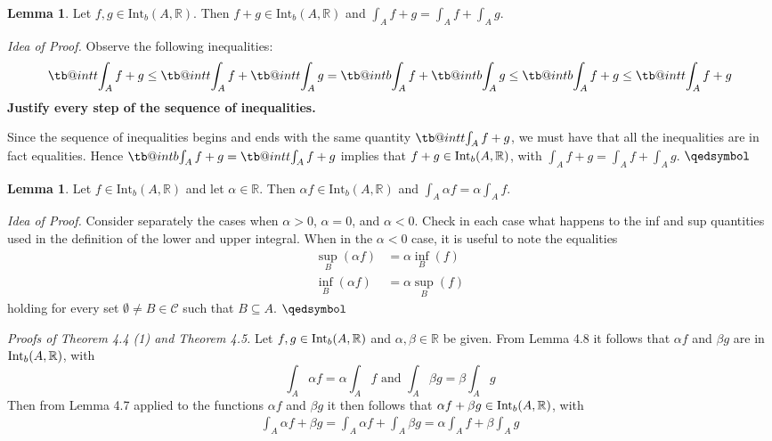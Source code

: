 \documentclass[11pt]{article}
\makeatletter
\theoremstyle{definition}
\newtheorem{lemma}[thm]{Lemma}
\newcommand{\R}{\ensuremath{\mathbb{R}}}
\newcommand{\QED}{\tag*{$\qedsymbol$}}
\newcommand\tint{\mathop{\mathpalette\tb@int{t}}\!\int}
\newcommand\bint{\mathop{\mathpalette\tb@int{b}}\!\int}
\newcommand\tb@int[2]{%
  \sbox\z@{$\m@th#1\int$}%
  \if#2t%
    \rlap{\hbox to\wd\z@{%
      \hfil
      \vrule width .35em height \dimexpr\ht\z@+1.4pt\relax depth -\dimexpr\ht\z@+1pt\relax
      \kern.05em %
    }}
  \else
    \rlap{\hbox to\wd\z@{%
      \vrule width .35em height -\dimexpr\dp\z@+1pt\relax depth \dimexpr\dp\z@+1.4pt\relax
      \hfil
    }}
  \fi
}
\makeatother
\begin{document}
\begin{lemma}
Let $f, g \in \text{Int}_b(A, \mathbb{R})$.
Then $f + g \in \text{Int}_b(A, \mathbb{R})$ and $\int_A f + g = \int_A f + \int_A g$.
	
\emph{Idea of Proof.}
Observe the following inequalities:
$$\tint_A f+g \leq \tint_A f + \tint_A g = \bint_A f + \bint_A g \leq \bint_A f+g \leq \tint_A f+g$$
{\bf Justify every step of the sequence of inequalities.}

Since the sequence of inequalities begins and ends with the same quantity $\tint_A f+g$, we must have that all the inequalities are in fact equalities. Hence $\bint_A f + g = \tint_A f+g$ implies that $f+g \in {\rm Int}_b(A, \R)$, with $\int_A f + g = \int_A f + \int_A g$. \hfill $\qedsymbol$
\end{lemma}

\begin{lemma}
Let $f \in \text{Int}_b(A, \mathbb{R})$ and let $\alpha \in \mathbb{R}$.
Then $\alpha f \in \text{Int}_b(A, \mathbb{R})$ and $\int_A \alpha f = \alpha \int_A f$.
	
\emph{Idea of Proof.} Consider separately the cases when $\alpha > 0$, $\alpha = 0$, and $\alpha < 0$. Check in each case what happens to the inf and sup quantities used in the definition of the lower and upper integral. When in the $\alpha < 0$ case, it is useful to note the equalities
\begin{align*}
    \sup_B (\alpha f) &= \alpha \inf_B (f) \\
    \inf_B (\alpha f) &= \alpha \sup_B (f)
\end{align*}
holding for every set $\emptyset \neq B \in \mathcal{C}$ such that $B \subseteq A$. \hfill $\qedsymbol$
\end{lemma}

{\it Proofs of Theorem 4.4 (1) and Theorem 4.5.} 
Let $f, g \in {\rm Int}_b (A, \R)$ and $\alpha, \beta \in \R$ be given. From Lemma 4.8 it follows that $\alpha f$ and $\beta g$ are in ${\rm Int}_b (A, \R)$, with
$$\int_A \alpha f = \alpha \int_A f \text{ and } \int_A \beta g = \beta \int_A g$$
Then from Lemma 4.7 applied to the functions $\alpha f$ and $\beta g$ it then follows that $\alpha f + \beta g \in {\rm Int}_b (A, \R)$, with
\begin{align*}
\int_A \alpha f + \beta g = \int_A \alpha f + \int_A \beta g = \alpha \int_A f + \beta \int_A g \QED
\end{align*}
\vspace{0.20cm}
\end{document}
